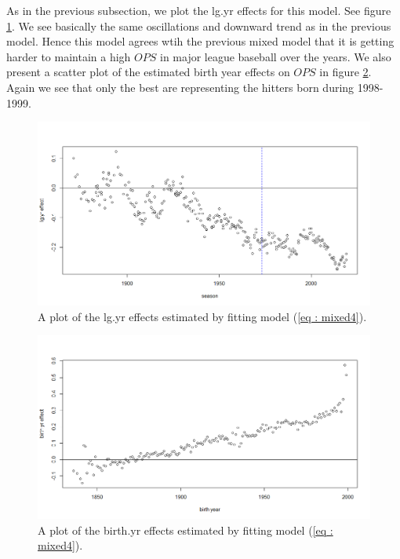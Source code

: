 \documentclass [52pt] {article}
\begin{document}
As in the previous subsection, we plot the lg.yr effects for this model.  See figure \ref{fig : lg.yr_effs_mixed4}.  We see basically the same oscillations and downward trend as in the previous model.  Hence this model agrees wtih the previous mixed model that it is getting harder to maintain a high $OPS$ in major league baseball over the years.  We also present a scatter plot of the estimated birth year effects on $OPS$ in figure \ref{fig : birth.yr_effs_mixed4}.  Again we see that only the best are representing the hitters born during 1998-1999.
\begin{figure}[h!]
\centering
\includegraphics[scale = 0.5]{lg.yr_effs_mixed4.png}
\caption{\label{fig : lg.yr_effs_mixed4} A plot of the lg.yr effects estimated by fitting model (\ref{eq : mixed4}).}
\end{figure}
\begin{figure}[h!]
\centering
\includegraphics[scale = 0.5]{birth.yr_effs_mixed4.png}
\caption{\label{fig : birth.yr_effs_mixed4} A plot of the birth.yr effects estimated by fitting model (\ref{eq : mixed4}).}
\end{figure}
\end{document}
